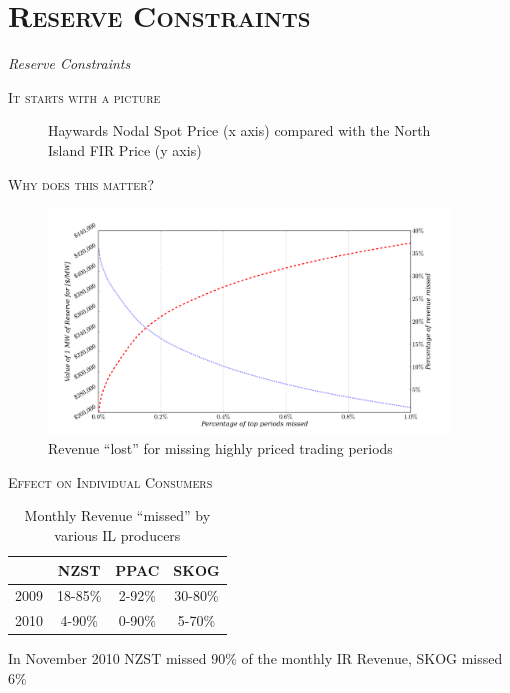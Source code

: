 \documentclass[xcolor=x11names,compress]{beamer}
\renewcommand{\(}{\begin{columns}}
\renewcommand{\)}{\end{columns}}
\newcommand{\<}[1]{\begin{column}{#1}}
\renewcommand{\>}{\end{column}}
\begin{document}
\section{\scshape Reserve Constraints}
\begin{frame}
\vspace{1.5cm}
\begin{center}
{\Huge\textit{Reserve Constraints}}
\end{center}
\end{frame}

\begin{frame}{\scshape It starts with a picture}
\begin{figure}
\caption{Haywards Nodal Spot Price (x axis) compared with the North Island
FIR Price (y axis)}
\end{figure}
\end{frame}

\begin{frame}{\scshape Why does this matter?}
\begin{figure}
\includegraphics[width=0.95\textwidth]{img/reserveprice.png}
\caption{Revenue ``lost'' for missing highly priced trading periods}
\end{figure}
\end{frame}

\begin{frame}{\scshape Effect on Individual Consumers}
\begin{table}
\caption{Monthly Revenue ``missed'' by various IL producers}
\begin{tabular}{cccc}
\toprule
& NZST & PPAC & SKOG \\
\midrule
2009 & 18-85\% & 2-92\% & 30-80\% \\
2010 & 4-90\% & 0-90\% & 5-70\% \\
\bottomrule
\end{tabular}
\end{table}
In November 2010 NZST missed 90\% of the monthly IR Revenue, SKOG missed 6\%
\vspace{2cm}
\end{frame}
\end{document}
